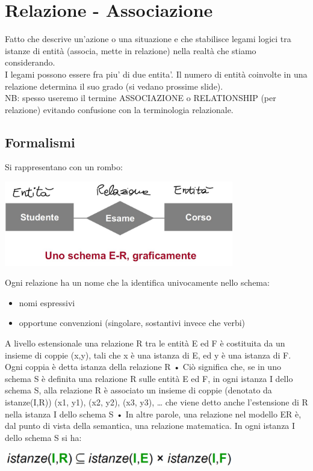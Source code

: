 \section{Relazione - Associazione}
Fatto che descrive un'azione o una situazione e che stabilisce legami logici tra istanze di entità (associa, mette in relazione) nella realtà che stiamo considerando.
\\I legami possono essere fra piu' di due entita'. Il numero di entità coinvolte in una relazione determina il suo grado (si vedano prossime slide).
\\NB: spesso useremo il termine ASSOCIAZIONE o RELATIONSHIP (per relazione) evitando confusione con la terminologia relazionale.
\subsection{Formalismi}
Si rappresentano con un rombo:
\begin{center}
    \includegraphics[width=0.75\textwidth]{chaptersLezioniSara/img/ER1.jpg}
\end{center}
Ogni relazione ha un nome che la identifica univocamente nello schema:
\begin{itemize}
    \item nomi espressivi
    \item opportune convenzioni (singolare, sostantivi invece che verbi)
\end{itemize}
A livello estensionale una relazione R tra le entità E ed F è
costituita da un insieme di coppie (x,y), tali che x è una istanza
di E, ed y è una istanza di F. Ogni coppia è detta istanza della
relazione R
• Ciò significa che, se in uno schema S è definita una relazione
R sulle entità E ed F, in ogni istanza I dello schema S, alla
relazione R è associato un insieme di coppie (denotato da
istanze(I,R)) {(x1, y1), (x2, y2), (x3, y3), …}
che viene detto anche l’estensione di R nella istanza I dello
schema S
• In altre parole, una relazione nel modello ER è, dal punto di
vista della semantica, una relazione matematica. In ogni
istanza I dello schema S si ha:
\begin{center}
    \includegraphics[width=0.75\textwidth]{chaptersLezioniSara/img/Relazioni1.jpg}
\end{center}

